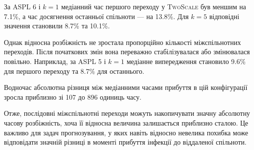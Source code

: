 \documentclass[a4paper,fleqn]{cas-sc}
\newcommand{\TS}{\textup{\textsc{TwoScale}}}
\begin{document}
За ASPL 6 і $k=1$ медіанний
час першого переходу у \TS{}
був меншим на 7.1\%,
а час досягнення останньої спільноти
--- на 13.8\%.
Для $k=5$ відповідні значення
становили 8.7\% та 10.1\%.

Однак відносна розбіжність
не зростала пропорційно кількості
міжспільнотних переходів.
Після початкових змін вона
переважно стабілізувалася
або змінювалася повільно.
Наприклад, за ASPL 5 і $k=1$
медіанне випередження становило
9.6\% для першого переходу
та 8.7\% для останнього.

Водночас абсолютна різниця
між медіанними часами прибуття
в цій конфігурації зросла
приблизно зі 107 до 896
одиниць часу.

Отже, послідовні міжспільнотні
переходи можуть накопичувати
значну абсолютну часову розбіжність,
хоча її відносна величина
залишається приблизно сталою.
Це важливо для задач прогнозування,
у яких навіть відносно невелика
похибка може відповідати значній
різниці в моменті прибуття інфекції
до віддаленої спільноти.
\end{document}
